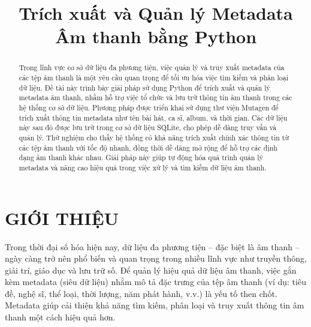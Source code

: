 \documentclass[conference]{IEEEtran}
\begin{document}
\title{Trích xuất và Quản lý Metadata Âm thanh bằng Python}

\author{
}

\maketitle

\begin{abstract}
Trong lĩnh vực cơ sở dữ liệu đa phương tiện, việc quản lý và truy xuất metadata của các tệp âm thanh 
là một yêu cầu quan trọng để tối ưu hóa việc tìm kiếm và phân loại dữ liệu. 
Đề tài này trình bày giải pháp sử dụng Python để trích xuất và quản lý metadata âm thanh, 
nhằm hỗ trợ việc tổ chức và lưu trữ thông tin âm thanh trong các hệ thống cơ sở dữ liệu. 
Phương pháp được triển khai sử dụng thư viện Mutagen để trích xuất thông tin metadata 
như tên bài hát, ca sĩ, album, và thời gian. Các dữ liệu này sau đó được lưu trữ trong cơ sở dữ liệu SQLite, 
cho phép dễ dàng truy vấn và quản lý. Thử nghiệm cho thấy hệ thống có khả năng trích xuất chính xác 
thông tin từ các tệp âm thanh với tốc độ nhanh, đồng thời dễ dàng mở rộng để hỗ trợ các định dạng âm thanh khác nhau. 
Giải pháp này giúp tự động hóa quá trình quản lý metadata và nâng cao hiệu quả trong việc xử lý và tìm kiếm dữ liệu âm thanh.
\end{abstract}

\section{GIỚI THIỆU}
Trong thời đại số hóa hiện nay, dữ liệu đa phương tiện – đặc biệt là âm thanh – 
ngày càng trở nên phổ biến và quan trọng trong nhiều lĩnh vực như truyền thông, giải trí, giáo dục và lưu trữ số. 
Để quản lý hiệu quả dữ liệu âm thanh, việc gắn kèm metadata (siêu dữ liệu) nhằm mô tả đặc trưng của tệp âm thanh 
(ví dụ: tiêu đề, nghệ sĩ, thể loại, thời lượng, năm phát hành, v.v.) là yếu tố then chốt. 
Metadata giúp cải thiện khả năng tìm kiếm, phân loại và truy xuất thông tin âm thanh một cách hiệu quả hơn.
\end{document}

